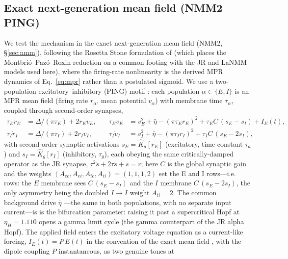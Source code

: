 \documentclass[11pt,a4paper]{article}
\providecommand{\DIFaddtex}[1]{{\protect\color{blue} \sf #1}} %
\providecommand{\DIFdeltex}[1]{{\protect\color{red} \scriptsize #1}} %
\providecommand{\DIFaddbegin}{} %
\providecommand{\DIFaddend}{} %
\providecommand{\DIFdelbegin}{} %
\providecommand{\DIFdelend}{} %
\providecommand{\DIFadd}[1]{\texorpdfstring{\DIFaddtex{#1}}{#1}} %
\providecommand{\DIFdel}[1]{\texorpdfstring{\DIFdeltex{#1}}{}} %
\begin{document}
\subsection{Exact next-generation mean field (NMM2 PING)}
We test the mechanism in the exact next-generation mean field (NMM2, \S\ref{sec:nmm}),
following the Rosetta Stone formulation of \cite{ruffini2025rosetta} (which places the
Montbri\'o--Paz\'o--Roxin reduction \cite{montbrio2015} on a common footing with the JR
and LaNMM models used here), where the firing-rate nonlinearity is the derived MPR
dynamics of Eq.~\eqref{eq:mpr} rather than a postulated sigmoid. We use a two-population
excitatory--inhibitory (PING) motif \cite{ruffini2021nmm2,clusella2023,ruffini2025rosetta}:
each population $\alpha\in\{E,I\}$ is an MPR mean field (firing rate $r_\alpha$, mean
potential $v_\alpha$) with membrane time $\tau_\alpha$, coupled through second-order
synapses,
\begin{equation}
\begin{aligned}
\tau_E\dot r_E&=\Delta/(\pi\tau_E)+2r_Ev_E, &\quad
\tau_E\dot v_E&=v_E^2+\bar\eta-(\pi\tau_E r_E)^2+\tau_E C\,(s_E-s_I)+I_E(t),\\[2pt]
\tau_I\dot r_I&=\Delta/(\pi\tau_I)+2r_Iv_I, &\quad
\tau_I\dot v_I&=v_I^2+\bar\eta-(\pi\tau_I r_I)^2+\tau_I C\,(s_E-2s_I),
\end{aligned}
\label{eq:nmm2-ping}
\end{equation}
with second-order synaptic activations $s_E=\hat K_a[r_E]$ (excitatory, time constant
$\tau_a$) and $s_I=\hat K_g[r_I]$ (inhibitory, $\tau_g$), each obeying the same
critically-damped operator as the JR synapse, $\tau^2\ddot s+2\tau\dot s+s=r$; here $C$
is the global synaptic gain and the weights $(A_{ee},A_{ei},A_{ie},A_{ii})=(1,1,1,2)$
set the E and I \DIFdelbegin \DIFdel{rows---i.e.\ }\DIFdelend \DIFaddbegin \DIFadd{rows: }\DIFaddend the $E$ membrane sees $C\,(s_E-s_I)$ and the $I$ membrane
$C\,(s_E-2s_I)$, the only asymmetry being the doubled $I\!\to\!I$ weight $A_{ii}=2$. The common background drive $\bar\eta$ \DIFdelbegin \DIFdel{---the same in both
populations, with no separate input current---is }\DIFdelend \DIFaddbegin \DIFadd{is }\DIFaddend the bifurcation parameter: raising it
past a supercritical Hopf at $\bar\eta_H=1.110$ opens a gamma limit cycle (the gamma
counterpart of the JR alpha Hopf). The applied field enters the excitatory voltage equation
as a current-like forcing, $I_E(t)=P\,E(t)$ in the convention of the exact mean field
\cite{ruffini2021nmm2}, with the dipole coupling $P$ instantaneous, as two genuine tones at
\end{document}
